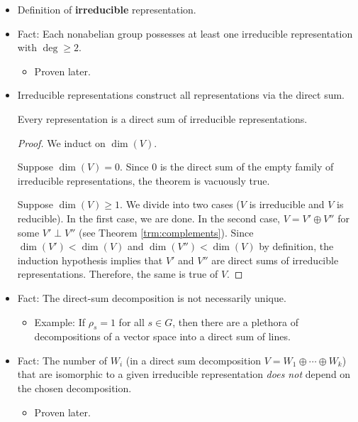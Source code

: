 \documentclass[../notes.tex]{subfiles}
\begin{document}
\begin{itemize}
    \item Definition of \textbf{irreducible} representation.
    \item Fact: Each nonabelian group possesses at least one irreducible representation with $\deg\geq 2$.
    \begin{itemize}
        \item Proven later.
    \end{itemize}
    \item Irreducible representations construct all representations via the direct sum.
    \begin{theorem}\label{trm:dirSumIrrep}
        Every representation is a direct sum of irreducible representations.
        \begin{proof}
            We induct on $\dim(V)$.\par
            Suppose $\dim(V)=0$. Since 0 is the direct sum of the empty family of irreducible representations, the theorem is vacuously true.\par
            Suppose $\dim(V)\geq 1$. We divide into two cases ($V$ is irreducible and $V$ is reducible). In the first case, we are done. In the second case, $V=V'\oplus V''$ for some $V'\perp V''$ (see Theorem \ref{trm:complements}). Since $\dim(V')<\dim(V)$ and $\dim(V'')<\dim(V)$ by definition, the induction hypothesis implies that $V'$ and $V''$ are direct sums of irreducible representations. Therefore, the same is true of $V$.
        \end{proof}
    \end{theorem}
    \item Fact: The direct-sum decomposition is not necessarily unique.
    \begin{itemize}
        \item Example: If $\rho_s=1$ for all $s\in G$, then there are a plethora of decompositions of a vector space into a direct sum of lines.
    \end{itemize}
    \item Fact: The number of $W_i$ (in a direct sum decomposition $V=W_1\oplus\cdots\oplus W_k$) that are isomorphic to a given irreducible representation \emph{does not} depend on the chosen decomposition.
    \begin{itemize}
        \item Proven later.
    \end{itemize}
\end{itemize}
\end{document}
